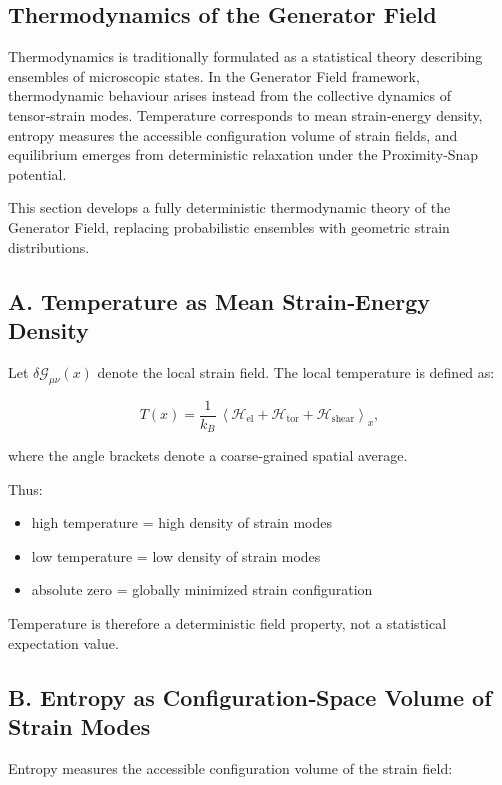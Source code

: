 \documentclass[reprint,amsmath,amssymb,aps,prl,floatfix]{revtex4-2}
\begin{document}
\begin{itemize}
\section{Thermodynamics of the Generator Field}

Thermodynamics is traditionally formulated as a statistical theory describing ensembles of microscopic states. In the Generator Field framework, thermodynamic behaviour arises instead from the collective dynamics of tensor‑strain modes. Temperature corresponds to mean strain‑energy density, entropy measures the accessible configuration volume of strain fields, and equilibrium emerges from deterministic relaxation under the Proximity‑Snap potential.
\medskip

This section develops a fully deterministic thermodynamic theory of the Generator Field, replacing probabilistic ensembles with geometric strain distributions.

\subsection{A. Temperature as Mean Strain‑Energy Density}

Let \(\delta\mathcal{G}_{\mu\nu}(x)\) denote the local strain field.  
The local temperature is defined as:

\[
T(x)
=
\frac{1}{k_B}\,
\left\langle
\mathcal{H}_{\mathrm{el}}
+
\mathcal{H}_{\mathrm{tor}}
+
\mathcal{H}_{\mathrm{shear}}
\right\rangle_x,
\]

where the angle brackets denote a coarse‑grained spatial average.
\medskip

Thus:
\begin{itemize}
\item high temperature = high density of strain modes  
\item low temperature = low density of strain modes  
\item absolute zero = globally minimized strain configuration
\end{itemize}

Temperature is therefore a deterministic field property, not a statistical expectation value.

\subsection{B. Entropy as Configuration‑Space Volume of Strain Modes}

Entropy measures the accessible configuration volume of the strain field:


\end{itemize}
\end{document}
